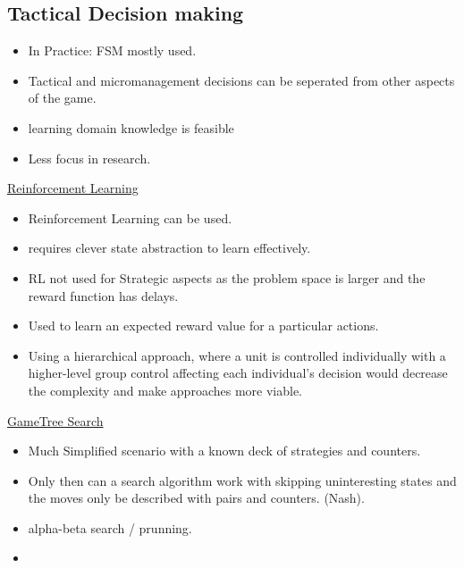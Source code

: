 \subsection{Tactical Decision making}
\begin{itemize}[noitemsep,nolistsep]
	\item In Practice: FSM mostly used.
	\item Tactical and micromanagement decisions can be seperated from other aspects of the game.
	\item learning domain knowledge is feasible
	\item Less focus in research.
\end{itemize}
\underline{Reinforcement Learning}
\begin{itemize}[noitemsep,nolistsep]
	\item Reinforcement Learning can be used. 
	\item requires clever state abstraction to learn effectively.
	\item RL not used for Strategic aspects as the problem space is larger and the reward function has delays.
	\item Used to learn an expected reward value for a particular actions.
	\item Using a hierarchical approach, where a unit is controlled individually with a higher-level group control affecting each individual's decision would decrease the complexity and make approaches more viable.
\end{itemize}
\underline{GameTree Search}
\begin{itemize}[noitemsep,nolistsep]
	\item Much Simplified scenario with a known deck of strategies and counters.
	\item Only then can a search algorithm work with skipping uninteresting states and the moves only be described with pairs and counters. (Nash).
	\item alpha-beta search / prunning.
	\item 
\end{itemize}


